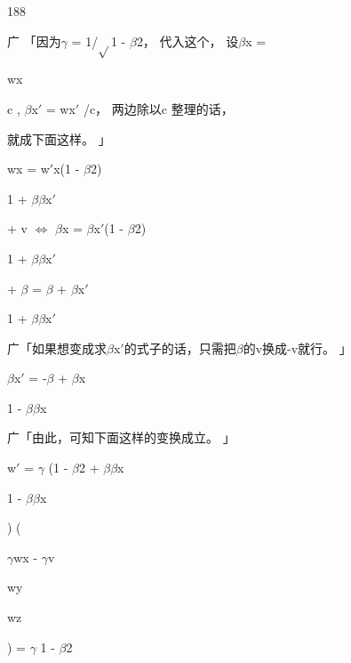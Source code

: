 188\par
广 「因为$\gamma$ = 1/$\sqrt{}$1 - $\beta$2， 代入这个， 设$\beta$x =\par
wx\par
c , $\beta$x$\prime$ = wx$\prime$ /c， 两边除以c 整理的话，\par
就成下面这样。 」\par
wx = w$\prime$x(1 - $\beta$2)\par
1 + $\beta$$\beta$x$\prime$\par
+ v $\Leftrightarrow$ $\beta$x = $\beta$x$\prime$(1 - $\beta$2)\par
1 + $\beta$$\beta$x$\prime$\par
+ $\beta$ = $\beta$ + $\beta$x$\prime$\par
1 + $\beta$$\beta$x$\prime$\par
广「如果想变成求$\beta$x$\prime$的式子的话，只需把$\beta$的v换成-v就行。 」\par
$\beta$x$\prime$ = -$\beta$ + $\beta$x\par
1 - $\beta$$\beta$x\par
广「由此，可知下面这样的变换成立。 」\par
w$\prime$ = $\gamma$ (1 - $\beta$2 + $\beta$$\beta$x\par
1 - $\beta$$\beta$x\par
) (\par
$\gamma$wx - $\gamma$v\par
wy\par
wz\par
) = $\gamma$ 1 - $\beta$2\par
